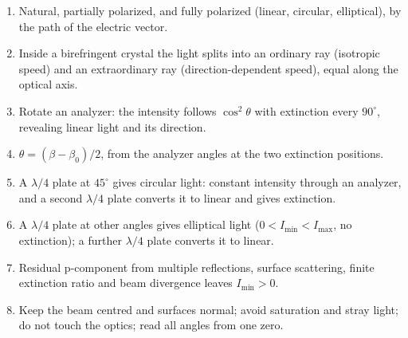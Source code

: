 \documentclass[11pt]{ctexart}
\begin{document}
\begin{enumerate}
\item Natural, partially polarized, and fully polarized (linear, circular, elliptical), by the path of the electric vector.
\item Inside a birefringent crystal the light splits into an ordinary ray (isotropic speed) and an extraordinary ray (direction-dependent speed), equal along the optical axis.
\item Rotate an analyzer: the intensity follows $\cos^2\theta$ with extinction every $90^\circ$, revealing linear light and its direction.
\item $\theta=(\beta-\beta_0)/2$, from the analyzer angles at the two extinction positions.
\item A $\lambda/4$ plate at $45^\circ$ gives circular light: constant intensity through an analyzer, and a second $\lambda/4$ plate converts it to linear and gives extinction.
\item A $\lambda/4$ plate at other angles gives elliptical light ($0<I_{\min}<I_{\max}$, no extinction); a further $\lambda/4$ plate converts it to linear.
\item Residual p-component from multiple reflections, surface scattering, finite extinction ratio and beam divergence leaves $I_{\min}>0$.
\item Keep the beam centred and surfaces normal; avoid saturation and stray light; do not touch the optics; read all angles from one zero.
\end{enumerate}
\end{document}
